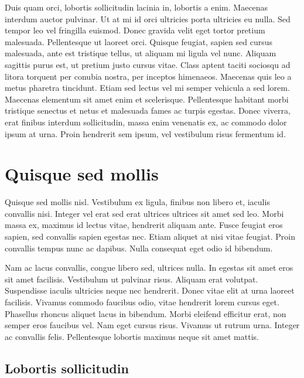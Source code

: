 \documentclass[twocolumn,a4paper,10pt]{article}
\begin{document}
Duis quam orci, lobortis sollicitudin lacinia in, lobortis a enim. Maecenas interdum auctor pulvinar.
Ut at mi id orci ultricies porta ultricies eu nulla. Sed tempor leo vel fringilla euismod. Donec gravida velit
eget tortor pretium malesuada. Pellentesque ut laoreet orci. Quisque feugiat, sapien sed cursus malesuada,
ante est tristique tellus, ut aliquam mi ligula vel nunc. Aliquam sagittis purus est, ut pretium justo cursus vitae.
Class aptent taciti sociosqu ad litora torquent per conubia nostra, per inceptos himenaeos.
Maecenas quis leo a metus pharetra tincidunt. Etiam sed lectus vel mi semper vehicula a sed lorem.
Maecenas elementum sit amet enim et scelerisque.
Pellentesque habitant morbi tristique senectus et netus et malesuada fames ac turpis egestas.
Donec viverra, erat finibus interdum sollicitudin, massa enim venenatis ex, ac commodo dolor ipsum at urna.
Proin hendrerit sem ipsum, vel vestibulum risus fermentum id.

\section{Quisque sed mollis}

Quisque sed mollis nisl. Vestibulum ex ligula, finibus non libero et, iaculis convallis nisi.
Integer vel erat sed erat ultrices ultrices sit amet sed leo. Morbi massa ex, maximus id lectus vitae,
hendrerit aliquam ante. Fusce feugiat eros sapien, sed convallis sapien egestas nec. Etiam aliquet at
nisi vitae feugiat. Proin convallis tempus nunc ac dapibus. Nulla consequat eget odio id bibendum.

Nam ac lacus convallis, congue libero sed, ultrices nulla. In egestas sit amet eros sit amet facilisis.
Vestibulum ut pulvinar risus. Aliquam erat volutpat. Suspendisse iaculis ultricies neque nec hendrerit.
Donec vitae elit at urna laoreet facilisis. Vivamus commodo faucibus odio, vitae hendrerit lorem cursus eget.
Phasellus rhoncus aliquet lacus in bibendum. Morbi eleifend efficitur erat, non semper eros faucibus vel.
Nam eget cursus risus. Vivamus ut rutrum urna. Integer ac convallis felis.
Pellentesque lobortis maximus neque sit amet mattis.

\subsection{Lobortis sollicitudin}
\end{document}
